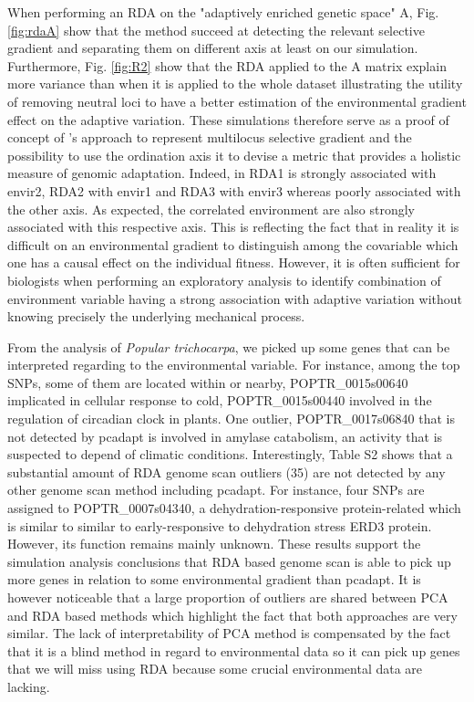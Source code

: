\documentclass[a4paper,times,10pt,authoryear]{article}%
\begin{document}
When performing an RDA on the "adaptively enriched genetic space" A, Fig. \ref{fig:rdaA} show that the method succeed at detecting the relevant selective gradient and separating them on different axis at least on our simulation. Furthermore, Fig. \ref{fig:R2} show that the RDA applied to the A matrix explain more variance than when it is applied to the whole dataset illustrating the utility of removing neutral loci to have a better estimation of the environmental gradient effect on the adaptive variation. These simulations therefore serve as a proof of concept of \citet{Steane2014a}'s approach to represent multilocus selective gradient and the possibility to use the ordination axis it to devise a metric that provides a holistic measure of genomic adaptation. Indeed, in RDA1 is strongly associated with envir2, RDA2 with envir1 and RDA3 with envir3 whereas poorly associated with the other axis. As expected, the correlated environment are also strongly associated with this respective axis. This is reflecting the fact that in reality it is difficult on an environmental gradient to distinguish  among the covariable which one has a causal effect on the individual fitness. However, it is often sufficient for biologists when performing an exploratory analysis to identify combination of environment variable having a strong association with adaptive variation without knowing precisely the underlying mechanical process.

From the analysis of \textit{Popular trichocarpa}, we picked up some genes that can be interpreted regarding to the environmental variable. For instance, among the top SNPs, some of them are located within or nearby, POPTR\_0015s00640 implicated in cellular response to cold, POPTR\_0015s00440 involved in the regulation of circadian clock in plants. One outlier, POPTR\_0017s06840 that is not detected by pcadapt is involved in amylase catabolism, an activity that is suspected to depend of climatic conditions. Interestingly, Table S2 shows that a substantial amount of RDA genome scan outliers (35) are not detected by any other genome scan method including pcadapt. For instance, four SNPs are assigned to POPTR\_0007s04340, a dehydration-responsive protein-related which is similar to similar to early-responsive to dehydration stress ERD3 protein. However, its function remains mainly unknown. These results support the simulation analysis conclusions that RDA based genome scan is able to pick up more genes in relation to some environmental gradient than pcadapt. It is however noticeable that a large proportion of outliers are shared between PCA and RDA based methods which highlight the fact that both approaches are very similar. The lack of interpretability of PCA method is compensated by the fact that it is a blind method in regard to environmental data so it can pick up genes that we will miss using RDA because some crucial environmental data are lacking.
\end{document}
